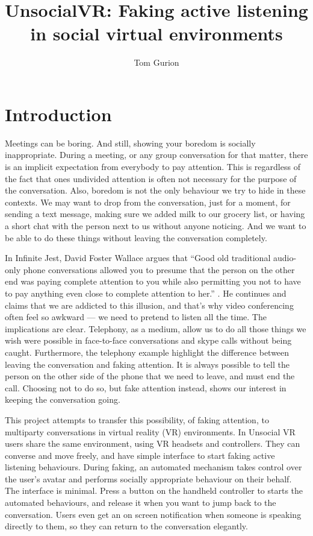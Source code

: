\documentclass[]{simple-thesis}
\title{UnsocialVR: Faking active listening in social virtual environments}
\author{Tom Gurion}
\affiliation{Media and Arts Technology\\Queen Mary University of London}
\begin{document}
\frontmatter{}  %


\setcounter{page}{1}  %
\chapter{Introduction}

Meetings can be boring.
And still, showing your boredom is socially inappropriate.
During a meeting, or any group conversation for that matter, there is an implicit expectation from everybody to pay attention.
This is regardless of the fact that ones undivided attention is often not necessary for the purpose of the conversation.
Also, boredom is not the only behaviour we try to hide in these contexts.
We may want to drop from the conversation, just for a moment, for sending a text message, making sure we added milk to our grocery list, or having a short chat with the person next to us without anyone noticing.
And we want to be able to do these things without leaving the conversation completely.

In Infinite Jest, David Foster Wallace argues that ``Good old traditional audio-only phone conversations allowed you to presume that the person on the other end was paying complete attention to you while also permitting you not to have to pay anything even close to complete attention to her.'' \citep{Wallace1996}.
He continues and claims that we are addicted to this illusion, and that's why video conferencing often feel so awkward --- we need to pretend to listen all the time.
The implications are clear.
Telephony, as a medium, allow us to do all those things we wish were possible in face-to-face conversations and skype calls without being caught.
Furthermore, the telephony example highlight the difference between leaving the conversation and faking attention.
It is always possible to tell the person on the other side of the phone that we need to leave, and must end the call.
Choosing not to do so, but fake attention instead, shows our interest in keeping the conversation going.

This project attempts to transfer this possibility, of faking attention, to multiparty conversations in virtual reality (VR) environments.
In Unsocial VR users share the same environment, using VR headsets and controllers.
They can converse and move freely, and have simple interface to start faking active listening behaviours.
During faking, an automated mechanism takes control over the user's avatar and performs socially appropriate behaviour on their behalf.
The interface is minimal.
Press a button on the handheld controller to starts the automated behaviours, and release it when you want to jump back to the conversation.
Users even get an on screen notification when someone is speaking directly to them, so they can return to the conversation elegantly.
\end{document}
